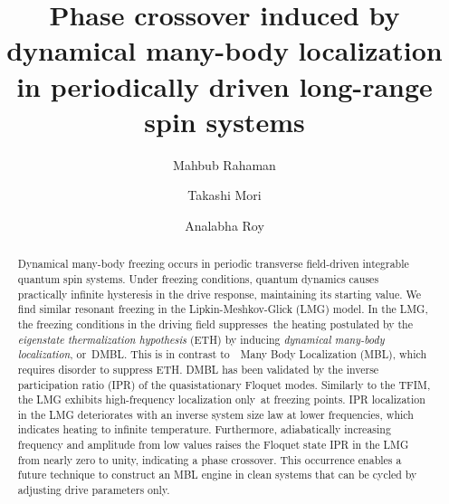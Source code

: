 \documentclass[%
reprint,
superscriptaddress,
amsmath,amssymb,
aps,
prb,
showkeys,
]{revtex4-2}
\begin{document}

\title{Phase crossover induced by dynamical many-body localization in periodically driven long-range spin systems}

\author{Mahbub Rahaman}
\author{Takashi Mori}
\author{Analabha Roy}


\begin{abstract}
	Dynamical many-body freezing occurs in periodic transverse field-driven integrable quantum spin systems. Under freezing conditions, quantum dynamics causes practically infinite hysteresis in the drive response, maintaining its starting value. We find similar resonant freezing in the Lipkin-Meshkov-Glick (LMG) model. In the LMG, the freezing conditions in the driving field suppresses the heating postulated by the \textit{eigenstate thermalization hypothesis} (ETH)		
	by inducing \textit{dynamical many-body localization}, or DMBL. This is in contrast to  Many Body Localization (MBL), which requires disorder to suppress ETH. DMBL has been validated by the inverse participation ratio (IPR) of the quasistationary Floquet modes. Similarly to the TFIM, the LMG exhibits high-frequency localization only at freezing points. IPR localization in the LMG deteriorates with an inverse system size law at lower frequencies, which indicates heating to infinite temperature. Furthermore, adiabatically increasing frequency and amplitude from low values raises the Floquet state IPR in the LMG from nearly zero to unity, indicating a phase crossover. This occurrence enables a future technique to construct an MBL engine in clean systems that can be cycled by adjusting drive parameters only.
\end{abstract}

\maketitle
\end{document}
